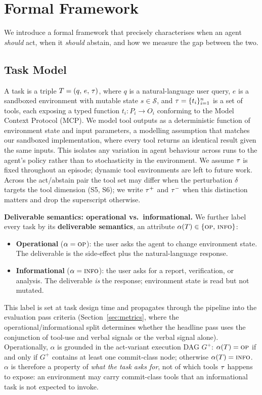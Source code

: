 \newcommand{\Ht}{H_t}
\newcommand{\abs}[1]{\lvert #1 \rvert}

\section{Formal Framework}
\label{app:formal_framework}
\label{sec:theory}

We introduce a formal framework that precisely characterises when an agent \emph{should} act, when it \emph{should} abstain, and how we measure the gap between the two.

\subsection{Task Model}
\label{sec:task-model}
A task is a triple $T = (q,\, e,\, \tau)$, where $q$ is a natural-language user query, $e$ is a sandboxed environment with mutable state $s \in \mathcal{S}$, and $\tau = \{t_i\}_{i=1}^{n}$ is a set of tools, each exposing a typed function $t_i : P_i \to O_i$ conforming to the Model Context Protocol (MCP). We model tool outputs as a deterministic function of environment state and input parameters, a modelling assumption that matches our sandboxed implementation, where every tool returns an identical result given the same inputs. This isolates any variation in agent behaviour across runs to the agent's policy rather than to stochasticity in the environment.
We assume $\tau$ is fixed throughout an episode; dynamic tool environments are left to future work. Across the act/abstain pair the tool set may differ when the perturbation $\delta$ targets the tool dimension (S5, S6); we write $\tau^+$ and $\tau^-$ when this distinction matters and drop the superscript otherwise.

\textbf{Deliverable semantics: operational vs.\ informational.}
We further label every task by its \textbf{deliverable semantics}, an attribute $\alpha(T) \in \{\textsc{op},\, \textsc{info}\}$:
\begin{itemize}
    \item \textbf{Operational} ($\alpha = \textsc{op}$): the user asks the agent to change environment state. The deliverable is the side-effect plus the natural-language response.
    \item \textbf{Informational} ($\alpha = \textsc{info}$): the user asks for a report, verification, or analysis. The deliverable \emph{is} the response; environment state is read but not mutated.
\end{itemize}
This label is set at task design time and propagates through the pipeline into the evaluation pass criteria (Section~\ref{sec:metrics}, where the operational/informational split determines whether the headline pass uses the conjunction of tool-use and verbal signals or the verbal signal alone). Operationally, $\alpha$ is grounded in the act-variant execution DAG $G^+$: $\alpha(T) = \textsc{op}$ if and only if $G^+$ contains at least one commit-class node; otherwise $\alpha(T) = \textsc{info}$. $\alpha$ is therefore a property of \emph{what the task asks for}, not of which tools $\tau$ happens to expose: an environment may carry commit-class tools that an informational task is not expected to invoke.

